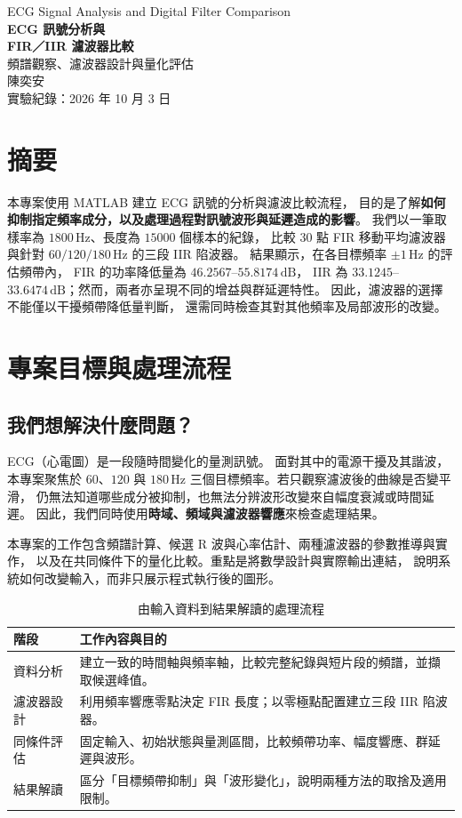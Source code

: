 \documentclass[11pt,a4paper,fontset=none,scheme=plain]{ctexart}
\newcommand{\Hz}{\,\mathrm{Hz}}
\newcommand{\dB}{\,\mathrm{dB}}
\begin{document}
\begin{center}
{\small\sffamily ECG Signal Analysis and Digital Filter Comparison}\\[0.8em]
{\LARGE\bfseries ECG 訊號分析與\\[0.18em]FIR／IIR 濾波器比較}\\[0.5em]
{\normalsize 頻譜觀察、濾波器設計與量化評估}\\[0.6em]
{\large 陳奕安}\\[0.3em]
{\small 實驗紀錄：2026 年 10 月 3 日}
\end{center}
\vspace{0.3em}

\section*{摘要}
本專案使用 MATLAB 建立 ECG 訊號的分析與濾波比較流程，
目的是了解\textbf{如何抑制指定頻率成分，以及處理過程對訊號波形與延遲造成的影響}。
我們以一筆取樣率為 $1800\Hz$、長度為 $15000$ 個樣本的紀錄，
比較 30 點 FIR 移動平均濾波器與針對 $60/120/180\Hz$ 的三段 IIR 陷波器。
結果顯示，在各目標頻率 $\pm1\Hz$ 的評估頻帶內，
FIR 的功率降低量為 $46.2567$--$55.8174\dB$，
IIR 為 $33.1245$--$33.6474\dB$；然而，兩者亦呈現不同的增益與群延遲特性。
因此，濾波器的選擇不能僅以干擾頻帶降低量判斷，
還需同時檢查其對其他頻率及局部波形的改變\cite{run2026}。

\section{專案目標與處理流程}
\subsection{我們想解決什麼問題？}
ECG（心電圖）是一段隨時間變化的量測訊號。
面對其中的電源干擾及其諧波，本專案聚焦於 $60$、$120$ 與 $180\Hz$
三個目標頻率。若只觀察濾波後的曲線是否變平滑，
仍無法知道哪些成分被抑制，也無法分辨波形改變來自幅度衰減或時間延遲。
因此，我們同時使用\textbf{時域、頻域與濾波器響應}來檢查處理結果。

本專案的工作包含頻譜計算、候選 R 波與心率估計、兩種濾波器的參數推導與實作，
以及在共同條件下的量化比較。重點是將數學設計與實際輸出連結，
說明系統如何改變輸入，而非只展示程式執行後的圖形。

\begin{table}[H]\centering
\caption{由輸入資料到結果解讀的處理流程}
\begin{tabularx}{\linewidth}{@{}p{2.4cm}Y@{}}
\toprule
階段 & 工作內容與目的 \\ \midrule
資料分析 & 建立一致的時間軸與頻率軸，比較完整紀錄與短片段的頻譜，並擷取候選峰值。\\
濾波器設計 & 利用頻率響應零點決定 FIR 長度；以零極點配置建立三段 IIR 陷波器。\\
同條件評估 & 固定輸入、初始狀態與量測區間，比較頻帶功率、幅度響應、群延遲與波形。\\
結果解讀 & 區分「目標頻帶抑制」與「波形變化」，說明兩種方法的取捨及適用限制。\\
\bottomrule
\end{tabularx}
\end{table}
\end{document}
